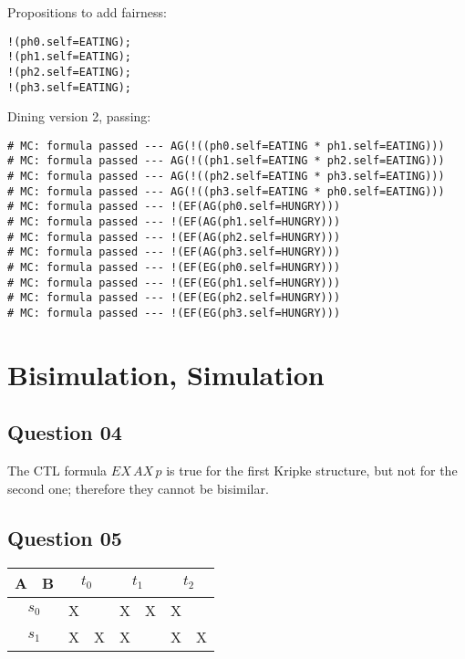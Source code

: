 \documentclass[a4paper]{article}
\begin{document}
Propositions to add fairness:
\begin{lstlisting}
!(ph0.self=EATING);
!(ph1.self=EATING);
!(ph2.self=EATING);
!(ph3.self=EATING);
\end{lstlisting}

Dining version 2, passing:
\begin{lstlisting}
# MC: formula passed --- AG(!((ph0.self=EATING * ph1.self=EATING)))
# MC: formula passed --- AG(!((ph1.self=EATING * ph2.self=EATING)))
# MC: formula passed --- AG(!((ph2.self=EATING * ph3.self=EATING)))
# MC: formula passed --- AG(!((ph3.self=EATING * ph0.self=EATING)))
# MC: formula passed --- !(EF(AG(ph0.self=HUNGRY)))
# MC: formula passed --- !(EF(AG(ph1.self=HUNGRY)))
# MC: formula passed --- !(EF(AG(ph2.self=HUNGRY)))
# MC: formula passed --- !(EF(AG(ph3.self=HUNGRY)))
# MC: formula passed --- !(EF(EG(ph0.self=HUNGRY)))
# MC: formula passed --- !(EF(EG(ph1.self=HUNGRY)))
# MC: formula passed --- !(EF(EG(ph2.self=HUNGRY)))
# MC: formula passed --- !(EF(EG(ph3.self=HUNGRY)))
\end{lstlisting}

\section*{Bisimulation, Simulation}

\subsection*{Question 04}

The CTL formula $EX\,AX\,p$ is true for the first Kripke structure, but not
for the second one; therefore they cannot be bisimilar.

\subsection*{Question 05}

\begin{center}
\begin{tabular}{ | l | l || l | l | l | l | l | l | }
  \hline
      A & B &
      \multicolumn{2}{c|}{$t_0$} &
      \multicolumn{2}{c|}{$t_1$} &
      \multicolumn{2}{c|}{$t_2$} \\
  \hline
  \hline
      \multicolumn{2}{|c||}{$s_0$}
      & X & & X & X & X & \\
  \hline
      \multicolumn{2}{|c||}{$s_1$}
      & X & X & X & & X & X \\
  \hline
\end{tabular}
\end{center}
\end{document}
